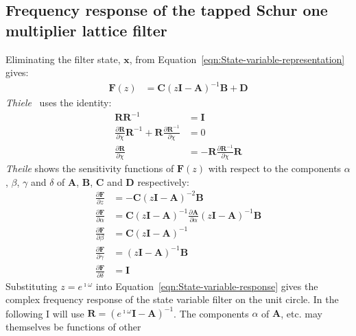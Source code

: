 \documentclass[a4paper,twoside,10pt,english]{article}
\begin{document}
\subsection{Frequency response of the tapped Schur one multiplier lattice filter\label{sec:Frequency-response-of-tapped-Schur-one-multiplier}}
Eliminating the filter state, $\mathbf{x}$, from
Equation~\ref{eqn:State-variable-representation} gives:
\begin{align}
\mathbf{F}\left(z\right) &= 
    \mathbf{C}\left(z\mathbf{I}-\mathbf{A}\right)^{-1}\mathbf{B}+\mathbf{D}
\label{eqn:State-variable-response}
\end{align}
\emph{Thiele}~\cite{Theile_SensitivityLinearStateSpaceSystems} uses the identity:
\begin{align*}
  \mathbf{R}\mathbf{R}^{-1} &= \mathbf{I} \\
\frac{\partial\mathbf{R}}{\partial\chi}\mathbf{R}^{-1} 
  +\mathbf{R}\frac{\partial\mathbf{R}^{-1}}{\partial\chi} &= 0 \\
  \frac{\partial\mathbf{R}}{\partial\chi} 
    &=-\mathbf{R}\frac{\partial\mathbf{R}^{-1}}{\partial\chi}\mathbf{R}
\end{align*}
\emph{Theile} shows the sensitivity functions of $\mathbf{F}\left(z\right)$ with
respect to the components $\alpha$, $\beta$, $\gamma$ and $\delta$ of
$\mathbf{A}$, $\mathbf{B}$, $\mathbf{C}$ and $\mathbf{D}$ respectively:
\begin{align*}
\frac{\partial\mathbf{F}}{\partial{}z} &= 
-\mathbf{C}\left(z\mathbf{I}-\mathbf{A}\right)^{-2}\mathbf{B} \\
  \frac{\partial\mathbf{F}}{\partial\alpha} &= 
\mathbf{C}\left(z\mathbf{I}-\mathbf{A}\right)^{-1}\frac{\partial\mathbf{A}}{\partial\alpha}
\left(z\mathbf{I}-\mathbf{A}\right)^{-1}\mathbf{B} \\
\frac{\partial\mathbf{F}}{\partial\beta} &= 
\mathbf{C}\left(z\mathbf{I}-\mathbf{A}\right)^{-1}\\
\frac{\partial\mathbf{F}}{\partial\gamma} &= 
\left(z\mathbf{I}-\mathbf{A}\right)^{-1}\mathbf{B}\\
\frac{\partial\mathbf{F}}{\partial\delta} &= \mathbf{I}
\end{align*}
Substituting $z=e^{\imath\omega}$ into Equation~\ref{eqn:State-variable-response}
gives the complex frequency response of the state variable filter on the unit
circle. In the following I will use
$\mathbf{R}=\left(e^{\imath\omega}\mathbf{I}-\mathbf{A}\right)^{-1}$. The
components $\alpha$ of $\mathbf{A}$, etc. may themselves be functions of other
\end{document}

